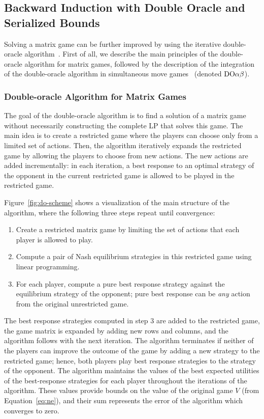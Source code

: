 \subsection{Backward Induction with Double Oracle and Serialized Bounds}\label{sec:algs:doab}

Solving a matrix game can be further improved by using the iterative double-oracle algorithm~\cite{McMahan03Planning}.
First of all, we describe the main principles of the double-oracle algorithm for matrix games, followed by the description of the integration of the double-oracle algorithm in simultaneous move games~\cite{Bosansky13Using} (denoted $\textrm{DO}\alpha\beta$).

\subsubsection{Double-oracle Algorithm for Matrix Games}\label{sec:doab}

The goal of the double-oracle algorithm is to find a solution of a matrix game without necessarily constructing the complete LP that solves this game.
The main idea is to create a restricted game where the players can choose only from a limited set of actions.
Then, the algorithm iteratively expands the restricted game by allowing the players to choose from new actions.
The new actions are added incrementally: in each iteration, a best response to an optimal strategy of the opponent in the current restricted game is
allowed to be played in the restricted game.

Figure~\ref{fig:do-scheme} shows a visualization of the main structure of the algorithm, where the following three steps repeat until convergence:
\begin{enumerate}
\item Create a restricted matrix game by limiting the set of actions that each player is allowed to play.
\item Compute a pair of Nash equilibrium strategies in this restricted game using linear programming.
\item For each player, compute a pure best response strategy against the equilibrium strategy of the opponent; pure best response can be \emph{any} action from the original unrestricted game.
\end{enumerate}
The best response strategies computed in step 3 are added to the restricted game, the game matrix is expanded by adding new rows and columns, and the algorithm follows with the next iteration. The algorithm terminates if neither of the players can improve the outcome of the game by adding a new strategy to the restricted game; hence, both players play best response strategies to the strategy of the opponent. The algorithm maintains the values of the best expected utilities of the best-response strategies for each player throughout the iterations of the algorithm. These values provide bounds on the value of the original game $V$ (from Equation~\ref{eq:ne}), and their sum represents the error of the algorithm which converges to zero.

